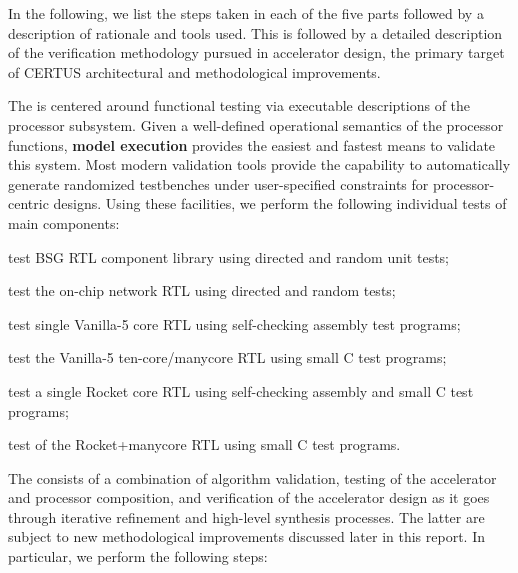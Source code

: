 In the following, we list the steps taken in each of the five parts followed by a description of rationale and tools used. This is followed by a detailed description of the verification methodology pursued in accelerator design, the primary target of CERTUS architectural and methodological improvements.

\medskip
\begin{cbxlist}{1.5em}{1em}{1em}

 \item The 
    is centered around functional testing via executable descriptions of the processor subsystem. Given a well-defined operational semantics of the processor functions, {\bf model execution} provides the easiest and fastest means to validate this system. Most modern validation tools provide the capability to automatically generate randomized testbenches under user-specified constraints for processor-centric designs. Using these facilities, we perform the following individual tests of main components:

    \smallskip
    \begin{cbxlist}[--]{1.5em}{0em}{0em}
      \raggedright

      \item test BSG RTL component library using directed and random
         unit tests;
      \item test the on-chip network RTL using directed and random
         tests;

      \item test single Vanilla-5 core RTL using self-checking
         assembly test programs;

      \item test the Vanilla-5 ten-core/manycore RTL using small C
         test programs;

      \item test a single Rocket core RTL using self-checking
         assembly and small C test programs;

      \item test of the Rocket+manycore RTL using small C test programs.

    \end{cbxlist}

 \item The  consists of a combination of algorithm validation, testing of the accelerator and processor composition, and verification of the accelerator design as it goes through iterative refinement and high-level synthesis processes. The latter are subject to new methodological improvements discussed later in this report. In particular, we perform the following steps:


\end{cbxlist}
